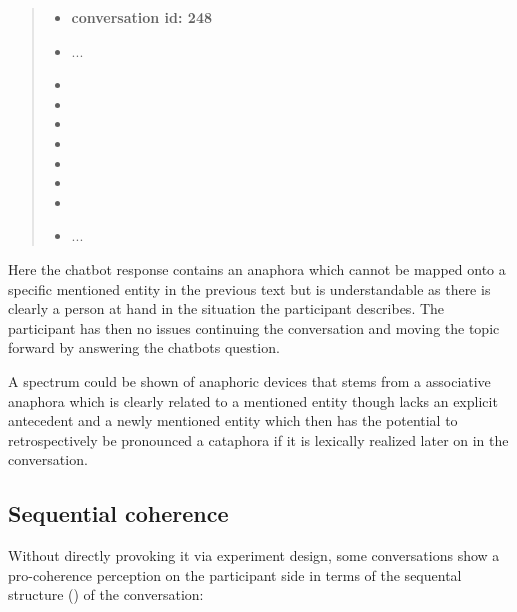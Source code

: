     \begin{quote}
    \begin{itemize}[label={}, leftmargin=0pt, itemsep=0.5em]
    \item \textbf{conversation id: 248}
    \item ...
    \item {}
    \item {}
    \item {}
    \item {}
    \item {}
    \item {}
    \item {}
    \item ...
    \end{itemize}
    \end{quote}

    Here the chatbot response contains an anaphora which
    cannot be mapped onto a specific mentioned entity in the previous text
    but is understandable as there is clearly a person at hand in the situation the participant describes.
    The participant has then no issues continuing the conversation and
    moving the topic forward by answering the chatbots question.

    A spectrum could be shown of anaphoric devices
    that stems from a associative anaphora which is clearly related to a mentioned entity
    though lacks an explicit antecedent and
    a newly mentioned entity which then has the potential to retrospectively be pronounced a cataphora
    if it is lexically realized later on in the conversation.

\subsection{Sequential coherence}

Without directly provoking it via experiment design,
some conversations show a pro-coherence perception on the participant side
in terms of the sequental structure () of the conversation:

